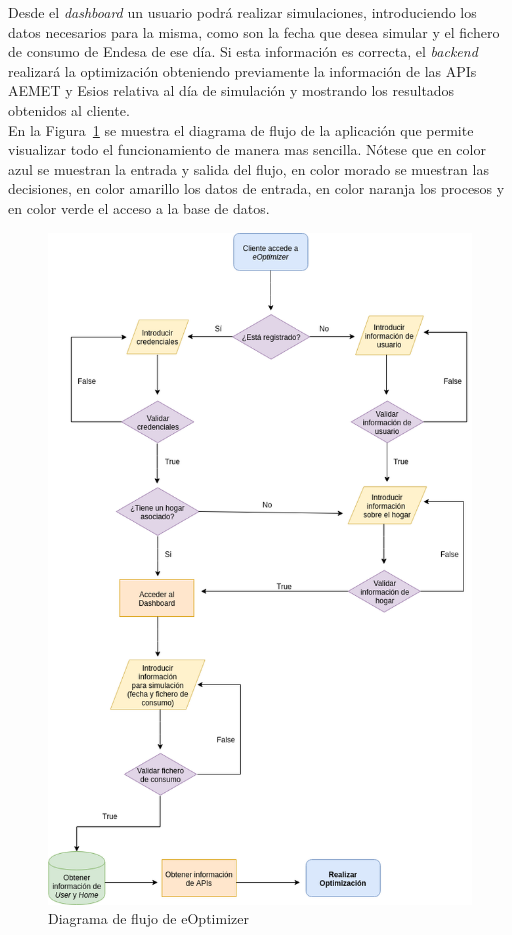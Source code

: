 Desde el \textit{dashboard} un usuario podrá realizar simulaciones, introduciendo los datos necesarios para la misma, como son la fecha que desea simular y el fichero de consumo de Endesa de ese día. Si esta información es correcta, el \textit{backend} realizará la optimización obteniendo previamente la información de las APIs AEMET y Esios relativa al día de simulación y mostrando los resultados obtenidos al cliente.\\

En la Figura~\ref{fig:diagrama-flujo} se muestra el diagrama de flujo de la aplicación que permite visualizar todo el funcionamiento de manera mas sencilla. Nótese que en color azul se muestran la entrada y salida del flujo, en color morado se muestran las decisiones, en color amarillo los datos de entrada, en color naranja los procesos y en color verde el acceso a la base de datos.\\
\begin{figure}[H]
            \centering
            \includegraphics[width=15cm]{figs/diagrama_flujo.png}
            \caption{Diagrama de flujo de eOptimizer}
            \label{fig:diagrama-flujo}
\end{figure}

